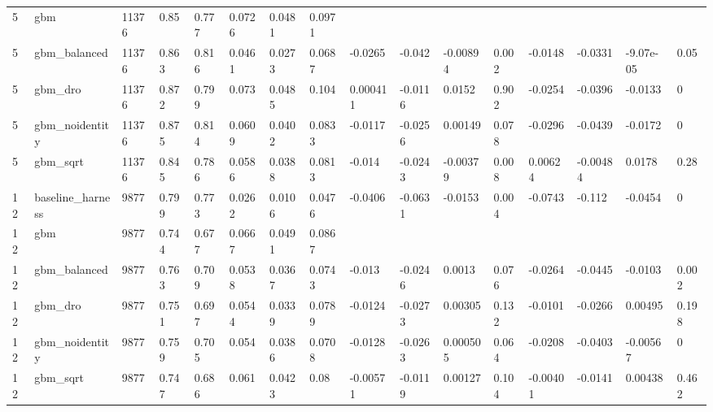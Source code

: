 \begin{tabular}{llllllllllllllll}
5 & gbm & 11376 & 0.85 & 0.777 & 0.0726 & 0.0481 & 0.0971 &  &  &  &  &  &  &  &  \\
5 & gbm\_balanced & 11376 & 0.863 & 0.816 & 0.0461 & 0.0273 & 0.0687 & -0.0265 & -0.042 & -0.00894 & 0.002 & -0.0148 & -0.0331 & -9.07e-05 & 0.05 \\
5 & gbm\_dro & 11376 & 0.872 & 0.799 & 0.073 & 0.0485 & 0.104 & 0.000411 & -0.0116 & 0.0152 & 0.902 & -0.0254 & -0.0396 & -0.0133 & 0 \\
5 & gbm\_noidentity & 11376 & 0.875 & 0.814 & 0.0609 & 0.0402 & 0.0833 & -0.0117 & -0.0256 & 0.00149 & 0.078 & -0.0296 & -0.0439 & -0.0172 & 0 \\
5 & gbm\_sqrt & 11376 & 0.845 & 0.786 & 0.0586 & 0.0388 & 0.0813 & -0.014 & -0.0243 & -0.00379 & 0.008 & 0.00624 & -0.00484 & 0.0178 & 0.28 \\
12 & baseline\_harness & 9877 & 0.799 & 0.773 & 0.0262 & 0.0106 & 0.0476 & -0.0406 & -0.0631 & -0.0153 & 0.004 & -0.0743 & -0.112 & -0.0454 & 0 \\
12 & gbm & 9877 & 0.744 & 0.677 & 0.0667 & 0.0491 & 0.0867 &  &  &  &  &  &  &  &  \\
12 & gbm\_balanced & 9877 & 0.763 & 0.709 & 0.0538 & 0.0367 & 0.0743 & -0.013 & -0.0246 & 0.0013 & 0.076 & -0.0264 & -0.0445 & -0.0103 & 0.002 \\
12 & gbm\_dro & 9877 & 0.751 & 0.697 & 0.0544 & 0.0339 & 0.0789 & -0.0124 & -0.0273 & 0.00305 & 0.132 & -0.0101 & -0.0266 & 0.00495 & 0.198 \\
12 & gbm\_noidentity & 9877 & 0.759 & 0.705 & 0.054 & 0.0386 & 0.0708 & -0.0128 & -0.0263 & 0.000505 & 0.064 & -0.0208 & -0.0403 & -0.00567 & 0 \\
12 & gbm\_sqrt & 9877 & 0.747 & 0.686 & 0.061 & 0.0423 & 0.08 & -0.00571 & -0.0119 & 0.00127 & 0.104 & -0.00401 & -0.0141 & 0.00438 & 0.462 \\
\bottomrule
\end{tabular}